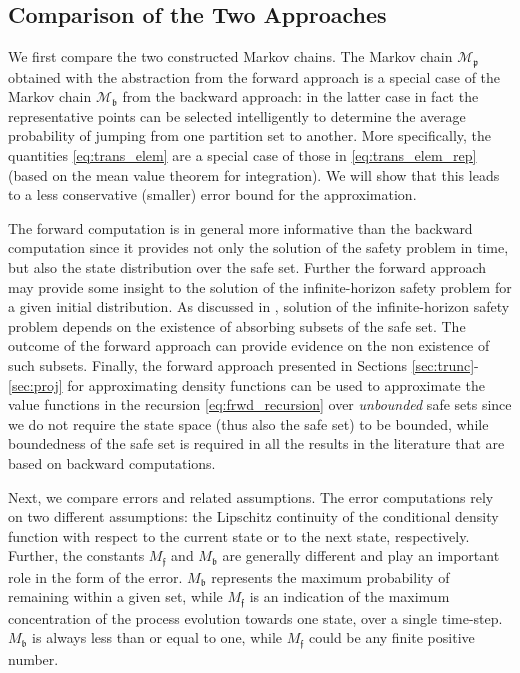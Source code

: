 \documentclass{LMCS}
\begin{document}
\subsection{Comparison of the Two Approaches}
\label{subsec:compare}

We first compare the two constructed Markov chains.
The Markov chain $\mathscr M_{\mathfrak p}$ obtained with the abstraction from the forward approach is a special case of the Markov chain $\mathscr M_{\mathfrak b}$ from the backward approach: in the latter case in fact the representative points can be selected intelligently to determine the average probability of jumping from one partition set to another. 
More specifically, the quantities \eqref{eq:trans_elem} are a special case of those in \eqref{eq:trans_elem_rep} (based on the mean value theorem for integration).
We will show that this leads to a less conservative (smaller) error bound for the approximation. 

The forward computation is in general more informative than the backward computation since it provides not only the solution of the safety problem in time, but also the state distribution over the safe set.
Further the forward approach may provide some insight to the solution of the infinite-horizon safety problem \cite{ta2011,TA14} for a given initial distribution. 
As discussed in \cite{TA14},
solution of the infinite-horizon safety problem depends on the existence of absorbing subsets of the safe set. 
The outcome of the forward approach can provide evidence on the non existence of such subsets.
Finally, the forward approach presented in Sections \ref{sec:trunc}-\ref{sec:proj} for approximating density functions can be used to approximate the value functions in the recursion \eqref{eq:frwd_recursion} over \emph{unbounded} safe sets since we do not require the state space (thus also the safe set) to be bounded, 
while boundedness of the safe set is required in all the results in the literature that are based on backward computations. 

Next, we compare errors and related assumptions. 
The error computations
rely on two different assumptions: 
the Lipschitz continuity of the conditional density function with respect to the current state or to the next state, respectively.  
Further, 
the constants $M_{\mathfrak f}$ and $M_{\mathfrak b}$ are generally different and play an important role in the form of the error. 
$M_{\mathfrak b}$ represents the maximum probability of remaining within a given set, 
while $M_{\mathfrak f}$ is an indication of the maximum concentration of the process evolution towards one state, over a single time-step. 
$M_{\mathfrak b}$ is always less than or equal to one, while $M_{\mathfrak f}$ could be any finite positive number.
\end{document}
